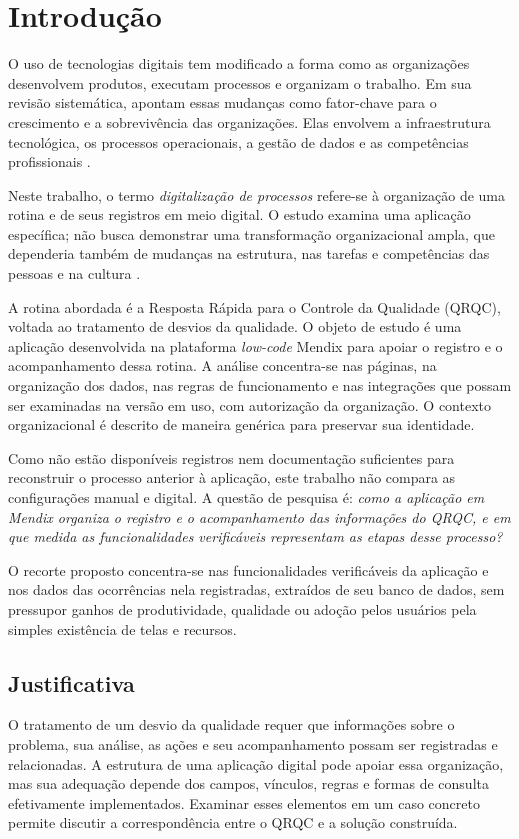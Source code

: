 \chapter{Introdução}
\label{cap:introducao}

O uso de tecnologias digitais tem modificado a forma como as organizações desenvolvem produtos, executam processos e organizam o trabalho. Em sua revisão sistemática,  apontam essas mudanças como fator-chave para o crescimento e a sobrevivência das organizações. Elas envolvem a infraestrutura tecnológica, os processos operacionais, a gestão de dados e as competências profissionais \cite[p.~7--8]{leite2024}.

Neste trabalho, o termo \emph{digitalização de processos} refere-se à organização de uma rotina e de seus registros em meio digital. O estudo examina uma aplicação específica; não busca demonstrar uma transformação organizacional ampla, que dependeria também de mudanças na estrutura, nas tarefas e competências das pessoas e na cultura \cite[p.~57]{murici2022}.

A rotina abordada é a Resposta Rápida para o Controle da Qualidade (QRQC), voltada ao tratamento de desvios da qualidade. O objeto de estudo é uma aplicação desenvolvida na plataforma \textit{low-code} Mendix para apoiar o registro e o acompanhamento dessa rotina. A análise concentra-se nas páginas, na organização dos dados, nas regras de funcionamento e nas integrações que possam ser examinadas na versão em uso, com autorização da organização. O contexto organizacional é descrito de maneira genérica para preservar sua identidade.

Como não estão disponíveis registros nem documentação suficientes para reconstruir o processo anterior à aplicação, este trabalho não compara as configurações manual e digital. A questão de pesquisa é: \emph{como a aplicação em Mendix organiza o registro e o acompanhamento das informações do QRQC, e em que medida as funcionalidades verificáveis representam as etapas desse processo?}

O recorte proposto concentra-se nas funcionalidades verificáveis da aplicação e nos dados das ocorrências nela registradas, extraídos de seu banco de dados, sem pressupor ganhos de produtividade, qualidade ou adoção pelos usuários pela simples existência de telas e recursos.

\section{Justificativa}
O tratamento de um desvio da qualidade requer que informações sobre o problema, sua análise, as ações e seu acompanhamento possam ser registradas e relacionadas. A estrutura de uma aplicação digital pode apoiar essa organização, mas sua adequação depende dos campos, vínculos, regras e formas de consulta efetivamente implementados. Examinar esses elementos em um caso concreto permite discutir a correspondência entre o QRQC e a solução construída.

